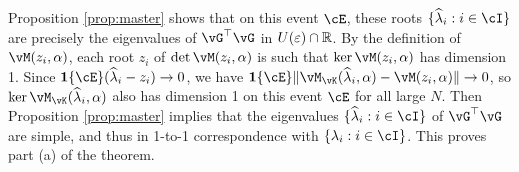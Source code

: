 \begin{proof-of-theorem}
Proposition \ref{prop:master} shows that on this event $\cE$,
these roots $\{\widehat \lambda_i:i \in \cI\}$ are
precisely the eigenvalues of $\vG^\top \vG$ in $U(\varepsilon) \cap \mathbb{R}$.
By the definition of $\vM(z_i,\alpha)$,
each root $z_i$ of $\det \vM(z_i,\alpha)$ is such that $\ker \vM(z_i,\alpha)$
has dimension 1. Since $\bI\{\cE\}(\widehat\lambda_i-z_i) \to 0$, we have
$\bI\{\cE\}\|\vM_{\vK}(\widehat \lambda_i,\alpha)-\vM(z_i,\alpha)\| \to 0$,
so $\ker \vM_{\vK}(\widehat \lambda_i,\alpha)$ also has dimension 1 on this
event $\cE$ for all large $N$. Then Proposition \ref{prop:master} implies that
the eigenvalues $\{\widehat \lambda_i:i \in \cI\}$ of $\vG^\top \vG$ are
simple, and thus in 1-to-1 correspondence with $\{\lambda_i:i \in \cI\}$.
This proves part (a) of the theorem.
 
\end{proof-of-theorem}

